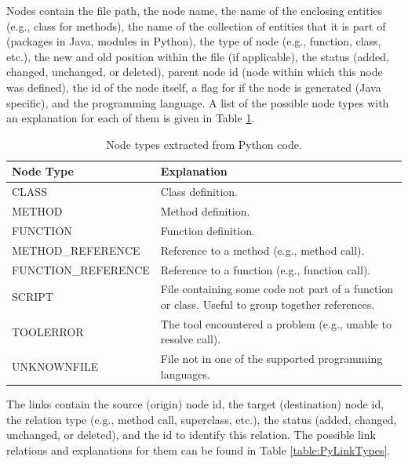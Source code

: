 \documentclass[a4paper,11pt,twoside]{article}
\theoremstyle{definition} %
\begin{document}
Nodes contain the file path, the node name, the name of the enclosing entities (e.g., class for methods), the name of the collection of entities that it is part of (packages in Java, modules in Python), the type of node (e.g., function, class, etc.), the new and old position within the file (if applicable), the status (added, changed, unchanged, or deleted), parent node id (node within which this node was defined), the id of the node itself, a flag for if the node is generated (Java specific), and the programming language. A list of the possible node types with an explanation for each of them is given in Table \ref{table:PyNodeTypes}.

\begin{table}[h!]
\begin{center}
\begin{tabular}{m{4.5cm} | m{9cm}} 
 \hline
 \rowcolor{lightgray} Node Type & Explanation \\
 \hline
 CLASS & Class definition. \\
 \hline
 METHOD & Method definition. \\
 \hline
 FUNCTION & Function definition. \\
 \hline
 METHOD\_REFERENCE & Reference to a method (e.g., method call). \\
 \hline
 FUNCTION\_REFERENCE & Reference to a function (e.g., function call). \\
 \hline
 SCRIPT & File containing some code not part of a function or class. Useful to group together references. \\
 \hline
 TOOLERROR & The tool encountered a problem (e.g., unable to resolve call). \\
 \hline
 UNKNOWNFILE  & File not in one of the supported programming languages. \\
 \hline
\end{tabular}
\end{center}
\caption{Node types extracted from Python code.}
\label{table:PyNodeTypes}
\end{table}

The links contain the source (origin) node id, the target (destination) node id, the relation type (e.g., method call, superclass, etc.), the status (added, changed, unchanged, or deleted), and the id to identify this relation. The possible link relations and explanations for them can be found in Table \ref{table:PyLinkTypes}.
\end{document}
